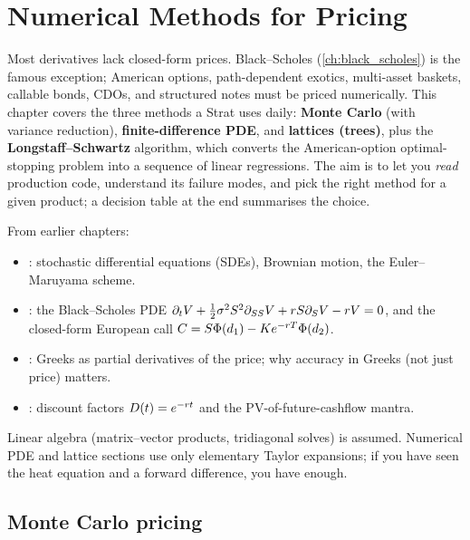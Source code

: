 \chapter{Numerical Methods for Pricing}
\label{ch:numerical_methods}

Most derivatives lack closed-form prices.  Black--Scholes
(\cref{ch:black_scholes}) is the famous exception; American options,
path-dependent exotics, multi-asset baskets, callable bonds, CDOs, and
structured notes must be priced numerically.  This chapter covers the
three methods a Strat uses daily: \textbf{Monte Carlo} (with
variance reduction), \textbf{finite-difference PDE}, and
\textbf{lattices (trees)}, plus the \textbf{Longstaff--Schwartz}
algorithm, which converts the American-option optimal-stopping problem
into a sequence of linear regressions.  The aim is to let you
\emph{read} production code, understand its failure modes, and pick
the right method for a given product; a decision table at the end
summarises the choice.

\begin{backgroundbox}[Prerequisites]
From earlier chapters:
\begin{itemize}
  \item {}: stochastic differential equations
    (SDEs), Brownian motion, the Euler--Maruyama scheme.
  \item {}: the Black--Scholes PDE
    $\partial_t V + \tfrac12 \sigma^2 S^2 \partial_{SS} V
     + r S \partial_S V - r V = 0$,
    and the closed-form European call
    $C = S \Phi(d_1) - K e^{-r T} \Phi(d_2)$.
  \item {}: Greeks as partial derivatives of the
    price; why accuracy in Greeks (not just price) matters.
  \item {}: discount factors
    $D(t) = e^{-r t}$ and the PV-of-future-cashflow mantra.
\end{itemize}
Linear algebra (matrix--vector products, tridiagonal solves) is
assumed.  Numerical PDE and lattice sections use only elementary
Taylor expansions; if you have seen the heat equation and a forward
difference, you have enough.
\end{backgroundbox}


\section{Monte Carlo pricing}
\label{sec:mc_pricing}

